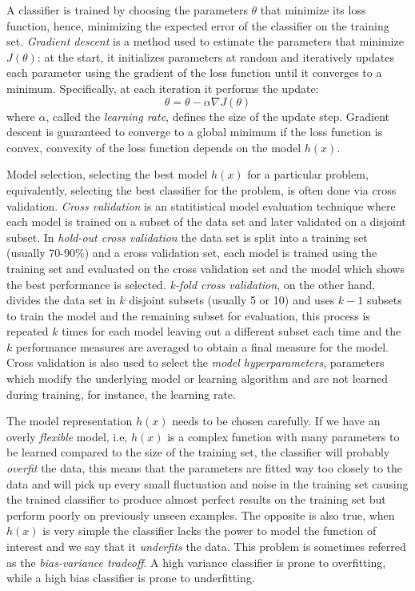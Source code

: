 A classifier is trained by choosing the parameters $\theta$ that minimize its loss function, hence, minimizing the expected error of the classifier on the training set. \emph{Gradient descent} is a method used to estimate the parameters that minimize $J(\theta)$: at the start, it initializes parameters at random and iteratively updates each parameter using the gradient of the loss function until it converges to a minimum. Specifically, at each iteration it performs the update:
\begin{equation}
	\theta = \theta - \alpha \nabla{J(\theta)}
\end{equation}
where $\alpha$, called the \emph{learning rate}, defines the size of the update step. Gradient descent is guaranteed to converge to a global minimum if the loss function is convex, convexity of the loss function depends on the model $h(x)$.

Model selection, selecting the best model $h(x)$ for a particular problem, equivalently, selecting the best classifier for the problem, is often done via cross validation. \emph{Cross validation} is an statitistical model evaluation technique where each model is trained on a subset of the data set and later validated on a disjoint subset. In \emph{hold-out cross validation} the data set is split into a training set (usually 70-90\%) and a cross validation set, each model is trained using the training set and evaluated on the cross validation set and the model which shows the best performance is selected. \emph{k-fold cross validation}, on the other hand, divides the data set in $k$ disjoint subsets (usually 5 or 10) and uses $k-1$ subsets to train the model and the remaining subset for evaluation, this process is repeated $k$ times for each model leaving out a different subset each time and the $k$ performance measures are averaged to obtain a final measure for the model. Cross validation is also used to select the \emph{model hyperparameters}, parameters which modify the underlying model or learning algorithm and are not learned during training, for instance, the learning rate.

The model representation $h(x)$ needs to be chosen carefully. If we have an overly \emph{flexible} model, i.e, $h(x)$ is a complex function with many parameters to be learned compared to the size of the training set, the classifier will probably \emph{overfit} the data, this means that the parameters are fitted way too closely to the data and will pick up every small fluctuation and noise in the training set causing the trained classifier to produce almost perfect results on the training set but perform poorly on previously unseen examples. The opposite is also true, when $h(x)$ is very simple the classifier lacks the power to model the function of interest and we say that it \emph{underfits} the data. This problem is sometimes referred as the \emph{bias-variance tradeoff}. A high variance classifier is prone to overfitting, while a high bias classifier is prone to underfitting.

